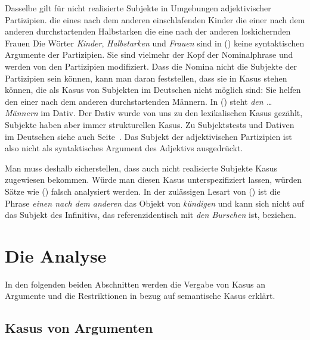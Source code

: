 Dasselbe gilt für nicht realisierte Subjekte in Umgebungen adjektivischer Partizipien.
\eal
\label{bsp-nominativ-adj}
\ex die eines nach dem anderen einschlafenden Kinder
\ex die einer nach dem anderen durchstartenden Halbstarken
\ex die eine nach der anderen loskichernden Frauen
\zl
Die Wörter \emph{Kinder}, \emph{Halbstarken} und \emph{Frauen} sind in () keine syntaktischen
Argumente der Partizipien. Sie sind vielmehr der Kopf der Nominalphrase und werden von den Partizipien
modifiziert. Dass die Nomina nicht die Subjekte der Partizipien sein können, kann man daran
feststellen, dass sie in Kasus stehen können, die als Kasus von Subjekten im Deutschen nicht möglich sind:
\ea
Sie helfen den einer nach dem anderen durchstartenden Männern.
\z
In () steht \emph{den \ldots{} Männern} im Dativ. Der Dativ wurde von uns zu den lexikalischen
Kasus gezählt, Subjekte haben aber immer strukturellen Kasus. Zu Subjektstests und Dativen im Deutschen
siehe auch Seite~\pageref{page-dativsubjekte}.
Das Subjekt der adjektivischen Partizipien ist also nicht als syntaktisches Argument des
Adjektivs ausgedrückt.

Man muss deshalb sicherstellen, dass auch nicht realisierte Subjekte Kasus zugewiesen bekommen.
Würde man diesen Kasus unterspezifiziert lassen, würden Sätze wie () falsch analysiert werden.
\z
In der zulässigen Lesart von () ist die Phrase 
\emph{einen nach dem anderen} das Objekt von \emph{kündigen} und kann
sich nicht auf das Subjekt des Infinitivs, das referenzidentisch
mit \emph{den Burschen} ist, beziehen.



\section{Die Analyse}

In den folgenden beiden Abschnitten werden die Vergabe von Kasus an Argumente und 
die Restriktionen in bezug auf semantische Kasus erklärt. 


\subsection{Kasus von Argumenten}

